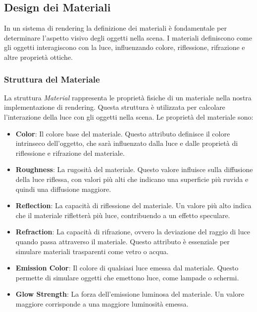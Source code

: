 \documentclass[12pt]{article}
\begin{document}
\subsection{Design dei Materiali}
In un sistema di rendering la definizione dei materiali è fondamentale per determinare l'aspetto visivo degli oggetti nella scena. I materiali definiscono come gli oggetti interagiscono con la luce, influenzando colore, riflessione, rifrazione e altre proprietà ottiche.

\subsubsection{Struttura del Materiale}
La struttura \textit{Material} rappresenta le proprietà fisiche di un materiale nella nostra implementazione di rendering. Questa struttura è utilizzata per calcolare l'interazione della luce con gli oggetti nella scena. Le proprietà del materiale sono:

\begin{itemize}
\item \textbf{Color}: Il colore base del materiale. Questo attributo definisce il colore intrinseco dell'oggetto, che sarà influenzato dalla luce e dalle proprietà di riflessione e rifrazione del materiale.

\item \textbf{Roughness}: La rugosità del materiale. Questo valore influisce sulla diffusione della luce riflessa, con valori più alti che indicano una superficie più ruvida e quindi una diffusione maggiore.

\item \textbf{Reflection}: La capacità di riflessione del materiale. Un valore più alto indica che il materiale rifletterà più luce, contribuendo a un effetto speculare.

\item \textbf{Refraction}: La capacità di rifrazione, ovvero la deviazione del raggio di luce quando passa attraverso il materiale. Questo attributo è essenziale per simulare materiali trasparenti come vetro o acqua.

\item \textbf{Emission Color}: Il colore di qualsiasi luce emessa dal materiale. Questo permette di simulare oggetti che emettono luce, come lampade o schermi.

\item \textbf{Glow Strength}: La forza dell'emissione luminosa del materiale. Un valore maggiore corrisponde a una maggiore luminosità emessa.
\end{itemize}
\end{document}
